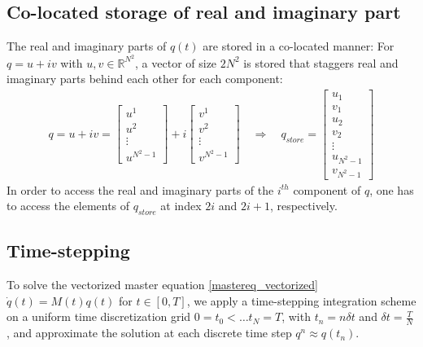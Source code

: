 \documentclass[letterpaper]{article}
\newcommand{\R}{\mathds{R}}
\begin{document}
  \subsection{Co-located storage of real and imaginary part}
  The real and imaginary parts of $q(t)$ are stored in a co-located manner: For
  $q = u+iv$ with $u,v\in\R^{N^2}$, a vector of size $2N^2$ is stored that
  staggers real and imaginary parts behind each other for each component:
  \begin{align*}
    q = u+iv = \begin{bmatrix}
     u^1\\u^2\\ \vdots \\ u^{N^2-1} 
    \end{bmatrix}
    + i \begin{bmatrix}
     v^1\\v^2\\ \vdots \\ v^{N^2-1} 
    \end{bmatrix}
    \quad \Rightarrow \quad
    q_{store} = \begin{bmatrix}
      u_1 \\ v_1\\ u_2 \\ v_2 \\ \vdots \\ u_{N^2-1} \\ v_{N^2-1}
    \end{bmatrix}
  \end{align*}
  In order to access the real and imaginary parts of the $i^{th}$ component of
  $q$, one has to access the elements of $q_{store}$ at index $2i$ and $2i+1$,
  respectively. 

  \subsection{Time-stepping}
    To solve the vectorized master equation \eqref{mastereq_vectorized} $\dot
    q(t) = M(t) q(t)$ for $t\in [0,T]$, we apply a time-stepping integration
    scheme on a uniform time discretization grid $0=t_0 < \dots t_{N} = T$, with
    $t_n = n \delta t$ and $\delta t = \frac{T}{N}$, and approximate the
    solution at each discrete time step $q^{n} \approx q(t_n)$.
   
\end{document}
